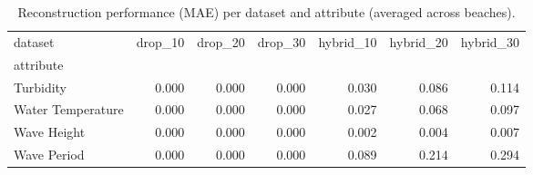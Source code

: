 \begin{table}
\caption{Reconstruction performance (MAE) per dataset and attribute (averaged across beaches).}
\label{tab:recon_mae_per_dataset_attribute}
\begin{tabular}{lrrrrrr}
\toprule
dataset & drop_10 & drop_20 & drop_30 & hybrid_10 & hybrid_20 & hybrid_30 \\
attribute &  &  &  &  &  &  \\
\midrule
Turbidity & 0.000 & 0.000 & 0.000 & 0.030 & 0.086 & 0.114 \\
Water Temperature & 0.000 & 0.000 & 0.000 & 0.027 & 0.068 & 0.097 \\
Wave Height & 0.000 & 0.000 & 0.000 & 0.002 & 0.004 & 0.007 \\
Wave Period & 0.000 & 0.000 & 0.000 & 0.089 & 0.214 & 0.294 \\
\bottomrule
\end{tabular}
\end{table}
